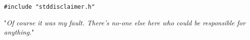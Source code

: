 \texttt{\#include "stddisclaimer.h"}

"\emph{Of course it was my fault. There’s no-one else here who could be responsible for anything.}"
